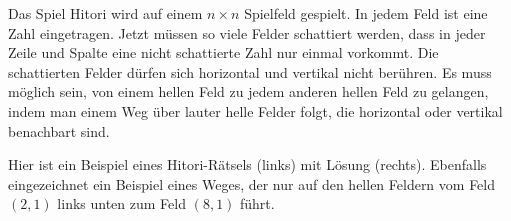 Das Spiel Hitori wird auf einem $n\times n$ Spielfeld gespielt.
In jedem Feld ist eine Zahl eingetragen.
Jetzt müssen so viele Felder schattiert werden, dass in jeder
Zeile und Spalte eine nicht schattierte Zahl nur einmal vorkommt.
Die schattierten Felder dürfen sich horizontal und vertikal nicht
berühren.
Es muss möglich sein, von einem hellen Feld zu jedem anderen hellen
Feld zu gelangen, indem man einem Weg über lauter helle Felder folgt,
die horizontal oder vertikal benachbart sind.

Hier ist ein Beispiel eines Hitori-Rätsels (links) mit Lösung (rechts).
Ebenfalls eingezeichnet ein Beispiel eines Weges, der nur auf den
hellen Feldern vom Feld $(2,1)$ links unten zum Feld $(8,1)$ führt.

\begin{center}

\end{center}
